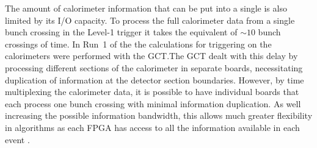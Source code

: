 The amount of calorimeter information that can be put into a single
\FPGA is also limited by its I/O capacity. To process the full
calorimeter data from a single bunch crossing in the Level-1 trigger
it takes the equivalent of $\sim10$ bunch crossings of time. In Run~1
of the \LHC the calculations for triggering on the calorimeters were
performed with the \ac{GCT}.The \ac{GCT} dealt with this delay by
processing different sections of the calorimeter in separate boards,
necessitating duplication of information at the detector section
boundaries. However, by time multiplexing the calorimeter data, it is
possible to have individual \FPGA boards that each process one bunch
crossing with minimal information duplication. As well increasing the
possible information bandwidth, this allows much greater flexibility
in algorithms as each FPGA has access to all the information available
in each event \cite{1748-0221-9-10-C10034,1748-0221-7-01-C01060}. 

